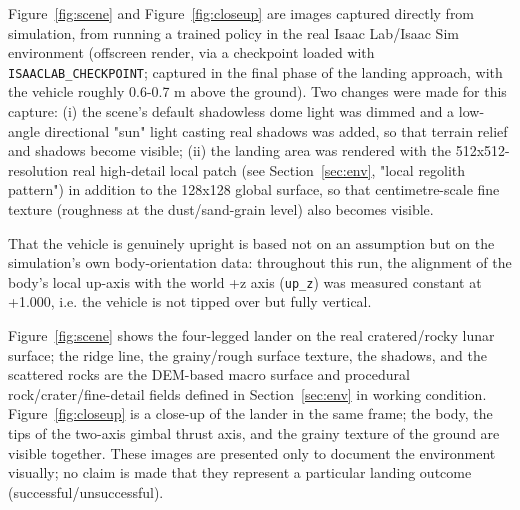 Figure~\ref{fig:scene} and Figure~\ref{fig:closeup} are images captured directly from simulation, from running a trained policy in the real Isaac Lab/Isaac Sim environment (offscreen render, via a checkpoint loaded with \texttt{ISAACLAB\_CHECKPOINT}; captured in the final phase of the landing approach, with the vehicle roughly 0.6-0.7 m above the ground). Two changes were made for this capture: (i) the scene's default shadowless dome light was dimmed and a low-angle directional "sun" light casting real shadows was added, so that terrain relief and shadows become visible; (ii) the landing area was rendered with the 512x512-resolution real high-detail local patch (see Section~\ref{sec:env}, "local regolith pattern") in addition to the 128x128 global surface, so that centimetre-scale fine texture (roughness at the dust/sand-grain level) also becomes visible.

That the vehicle is genuinely upright is based not on an assumption but on the simulation's own body-orientation data: throughout this run, the alignment of the body's local up-axis with the world +z axis (\texttt{up\_z}) was measured constant at +1.000, i.e. the vehicle is not tipped over but fully vertical.

Figure~\ref{fig:scene} shows the four-legged lander on the real cratered/rocky lunar surface; the ridge line, the grainy/rough surface texture, the shadows, and the scattered rocks are the DEM-based macro surface and procedural rock/crater/fine-detail fields defined in Section~\ref{sec:env} in working condition. Figure~\ref{fig:closeup} is a close-up of the lander in the same frame; the body, the tips of the two-axis gimbal thrust axis, and the grainy texture of the ground are visible together. These images are presented only to document the environment visually; no claim is made that they represent a particular landing outcome (successful/unsuccessful).
